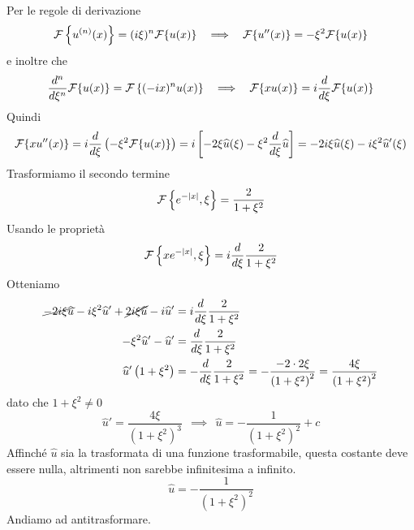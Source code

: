 \ParteSoluzioni

\Soluzione

Per le regole di derivazione
\begin{equation*}
\Fc \left\{u^{(n)}(x)\right\} = (i\xi)^{n}\Fc \{u(x)\} \ \ \implies \ \ \Fc \{u''(x)\} = - \xi^{2}\Fc \{u(x)\}
\end{equation*}
e inoltre che
\begin{equation*}
\frac{d^{n}}{d\xi^{n}}\Fc \{u(x)\} = \Fc \left\{(- ix)^{n} u(x)\right\} \ \ \implies \ \ \Fc \{xu(x)\} = i\frac{d}{d\xi}\Fc \{u(x)\}
\end{equation*}
Quindi
\begin{equation*}
\Fc \{xu''(x)\} = i\frac{d}{d\xi}\left(- \xi^{2}\Fc \{u(x)\}\right) = i\left[ - 2\xi \hat{u}(\xi) - \xi^{2}\frac{d}{d\xi}\hat{u}\right] = - 2i\xi \hat{u}(\xi) - i\xi^{2}\hat{u}'(\xi)
\end{equation*}
Trasformiamo il secondo termine
\begin{equation*}
\Fc \left\{e^{- | x|}, \xi \right\} = \frac{2}{1 + \xi^{2}}
\end{equation*}
Usando le proprietà
\begin{equation*}
\Fc \left\{xe^{- | x|}, \xi \right\} = i\frac{d}{d\xi}\frac{2}{1 + \xi^{2}}
\end{equation*}
Otteniamo
\begin{align*}
\cancel{- 2i\xi \hat{u}} - i\xi^{2}\hat{u}' + \cancel{2i\xi \hat{u}} - i\hat{u}' & = i\frac{d}{d\xi}\frac{2}{1 + \xi^{2}}\\
- \xi^{2}\hat{u}' - \hat{u}' & = \frac{d}{d\xi}\frac{2}{1 + \xi^{2}}\\
\hat{u}'\left(1 + \xi^{2}\right) & = - \frac{d}{d\xi}\frac{2}{1 + \xi^{2}} = - \frac{- 2 \cdot 2\xi}{\left(1 + \xi^{2}\right)^{2}} = \frac{4\xi}{\left(1 + \xi^{2}\right)^{2}}
\end{align*}
dato che $1 + \xi^{2} \neq 0$
\begin{equation*}
\hat{u}' = \frac{4\xi}{\left(1 + \xi^{2}\right)^{3}} \ \ \implies \ \ \hat{u} = - \frac{1}{\left(1 + \xi^{2}\right)^{2}} + c
\end{equation*}
Affinché $\hat{u}$ sia la trasformata di una funzione trasformabile, questa costante deve essere nulla, altrimenti non sarebbe infinitesima a infinito.
\begin{equation*}
\hat{u} = - \frac{1}{\left(1 + \xi^{2}\right)^{2}}
\end{equation*}
Andiamo ad antitrasformare.

